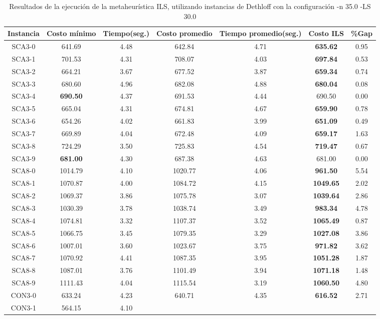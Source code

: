 \begin{table}[ht]
\caption{Resultados de la ejecución de la metaheurística ILS, utilizando instancias de Dethloff con la configuración -n 35.0 -LS 30.0}
\centering
\small
\begin{tabular}{c c c c c c c}
\hline\hline
Instancia & Costo mínimo & Tiempo(seg.) & Costo promedio & Tiempo promedio(seg.) & Costo ILS & \%Gap \\ [0.5ex]
\hline
SCA3-0 & 641.69 & 4.48 & 
642.84 & 4.71 & \bf{635.62} & 
0.95\\SCA3-1 & 701.53 & 4.31 & 
708.07 & 4.03 & \bf{697.84} & 
0.53\\SCA3-2 & 664.21 & 3.67 & 
677.52 & 3.87 & \bf{659.34} & 
0.74\\SCA3-3 & 680.60 & 4.96 & 
682.08 & 4.88 & \bf{680.04} & 
0.08\\SCA3-4 & \bf{690.50} & 4.37 & 
691.53 & 4.44 & 690.50 & 0.00\\
SCA3-5 & 665.04 & 4.31 & 
674.81 & 4.67 & \bf{659.90} & 
0.78\\SCA3-6 & 654.26 & 4.02 & 
661.83 & 3.99 & \bf{651.09} & 
0.49\\SCA3-7 & 669.89 & 4.04 & 
672.48 & 4.09 & \bf{659.17} & 
1.63\\SCA3-8 & 724.29 & 3.50 & 
725.83 & 4.54 & \bf{719.47} & 
0.67\\SCA3-9 & \bf{681.00} & 4.30 & 
687.38 & 4.63 & 681.00 & 0.00\\
SCA8-0 & 1014.79 & 4.10 & 
1020.77 & 4.06 & \bf{961.50} & 
5.54\\SCA8-1 & 1070.87 & 4.00 & 
1084.72 & 4.15 & \bf{1049.65} & 
2.02\\SCA8-2 & 1069.37 & 3.86 & 
1075.78 & 3.07 & \bf{1039.64} & 
2.86\\SCA8-3 & 1030.39 & 3.78 & 
1038.74 & 3.49 & \bf{983.34} & 
4.78\\SCA8-4 & 1074.81 & 3.32 & 
1107.37 & 3.52 & \bf{1065.49} & 
0.87\\SCA8-5 & 1066.75 & 3.45 & 
1079.35 & 3.29 & \bf{1027.08} & 
3.86\\SCA8-6 & 1007.01 & 3.60 & 
1023.67 & 3.75 & \bf{971.82} & 
3.62\\SCA8-7 & 1070.92 & 4.41 & 
1087.35 & 3.95 & \bf{1051.28} & 
1.87\\SCA8-8 & 1087.01 & 3.76 & 
1101.49 & 3.94 & \bf{1071.18} & 
1.48\\SCA8-9 & 1111.43 & 4.04 & 
1115.54 & 3.19 & \bf{1060.50} & 
4.80\\CON3-0 & 633.24 & 4.23 & 
640.71 & 4.35 & \bf{616.52} & 
2.71\\CON3-1 & 564.15 & 4.10 & 

\end{tabular}
\end{table}

